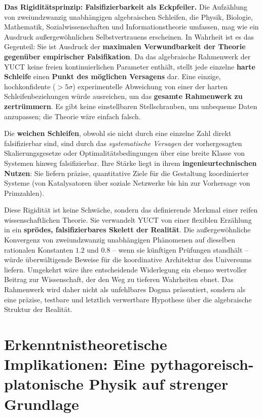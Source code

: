 \documentclass[12pt,a4paper]{article}
\begin{document}
	\vspace{0.5cm}
	\noindent
	\textbf{Das Rigiditätsprinzip: Falsifizierbarkeit als Eckpfeiler.}
	Die Aufzählung von zweiundzwanzig unabhängigen algebraischen Schleifen, die Physik, Biologie, Mathematik, Sozialwissenschaften und Informationstheorie umfassen, mag wie ein Ausdruck außergewöhnlichen Selbstvertrauens erscheinen. In Wahrheit ist es das Gegenteil: Sie ist Ausdruck der \textbf{maximalen Verwundbarkeit der Theorie gegenüber empirischer Falsifikation}. Da das algebraische Rahmenwerk der YUCT keine freien kontinuierlichen Parameter enthält, stellt jede einzelne \textbf{harte Schleife} einen \textbf{Punkt des möglichen Versagens} dar. Eine einzige, hochkonfidente (\(>5\sigma\)) experimentelle Abweichung von einer der harten Schleifenbeziehungen würde ausreichen, um das \textbf{gesamte Rahmenwerk zu zertrümmern}. Es gibt keine einstellbaren Stellschrauben, um unbequeme Daten anzupassen; die Theorie wäre einfach falsch.
	
	Die \textbf{weichen Schleifen}, obwohl sie nicht durch eine einzelne Zahl direkt falsifizierbar sind, sind durch das \textit{systematische Versagen} der vorhergesagten Skalierungsgesetze oder Optimalitätsbedingungen über eine breite Klasse von Systemen hinweg falsifizierbar. Ihre Stärke liegt in ihrem \textbf{ingenieurtechnischen Nutzen}: Sie liefern präzise, quantitative Ziele für die Gestaltung koordinierter Systeme (von Katalysatoren über soziale Netzwerke bis hin zur Vorhersage von Primzahlen).
	
	Diese Rigidität ist keine Schwäche, sondern das definierende Merkmal einer reifen wissenschaftlichen Theorie. Sie verwandelt YUCT von einer flexiblen Erzählung in ein \textbf{sprödes, falsifizierbares Skelett der Realität}. Die außergewöhnliche Konvergenz von zweiundzwanzig unabhängigen Phänomenen auf dieselben rationalen Konstanten \(1.2\) und \(0.8\) – wenn sie künftigen Prüfungen standhält – würde überwältigende Beweise für die koordinative Architektur des Universums liefern. Umgekehrt wäre ihre entscheidende Widerlegung ein ebenso wertvoller Beitrag zur Wissenschaft, der den Weg zu tieferen Wahrheiten ebnet. Das Rahmenwerk wird daher nicht als unfehlbares Dogma präsentiert, sondern als eine präzise, testbare und letztlich verwertbare Hypothese über die algebraische Struktur der Realität.
	
	\section*{Erkenntnistheoretische Implikationen: Eine pythagoreisch-platonische Physik auf strenger Grundlage}
	
\end{document}
